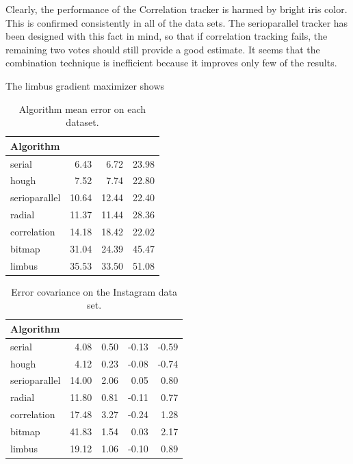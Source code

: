 Clearly, the performance of the Correlation tracker is harmed by bright iris color.
This is confirmed consistently in all of the data sets.
The serioparallel tracker has been designed with this fact in mind, so that if correlation tracking fails, the remaining two votes should still provide a good estimate.
It seems that the combination technique is inefficient because it improves only few of the results.

The limbus gradient maximizer shows

\begin{table}[h]
\centering
\begin{tabular}{l@{\hspace{1.5cm}}D{.}{.}{3.2}D{.}{.}{3.2}D{.}{.}{3.2}}
\toprule
\textbf{Algorithm} &  &  & \\
\midrule
serial            & 6.43 &6.72 & 23.98 \\
hough           & 7.52 & 7.74& 22.80 \\
serioparallel & 10.64 & 12.44& 22.40  \\
radial           & 11.37 & 11.44&  28.36 \\
correlation   & 14.18 &18.42&22.02  \\
bitmap          & 31.04 & 24.39&  45.47 \\
limbus          & 35.53 &33.50 &51.08   \\
\bottomrule
\end{tabular}
\caption{Algorithm mean error on each dataset.}\label{t:algo-mean-data}
\end{table}

\begin{table}[h]
\centering
\begin{tabular}{l@{\hspace{1.5cm}}D{.}{.}{3.2}D{.}{.}{3.2}D{.}{.}{3.2}D{.}{.}{3.2}}
\toprule
\textbf{Algorithm} &  &  &  & \\
\midrule
serial & 4.08 & 0.50 & -0.13 & -0.59\\
hough & 4.12 & 0.23 & -0.08 & -0.74\\
serioparallel & 14.00 & 2.06 & 0.05 & 0.80\\
radial & 11.80 & 0.81 & -0.11 & 0.77\\
correlation & 17.48 & 3.27 & -0.24 & 1.28\\
bitmap & 41.83 & 1.54 & 0.03 & 2.17\\
limbus & 19.12 & 1.06 & -0.10 & 0.89\\
\bottomrule
\end{tabular}
\caption{Error covariance on the Instagram data set.}\label{t:algo-covar-instagram}
\end{table}

